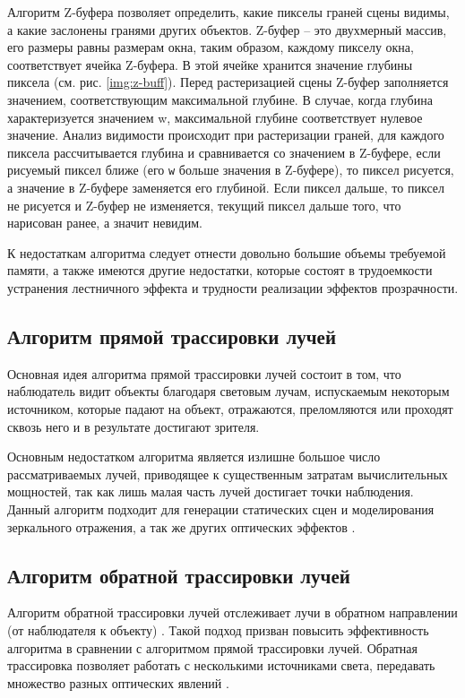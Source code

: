 Алгоритм Z-буфера \cite{rogers,shykin} позволяет определить, какие пикселы граней сцены видимы, а какие заслонены гранями других объектов. Z-буфер -- это двухмерный массив, его размеры равны размерам окна, таким образом, каждому пикселу окна, соответствует ячейка Z-буфера. В этой ячейке хранится значение глубины пиксела (см. рис. \ref{img:z-buff}). Перед растеризацией сцены Z-буфер заполняется значением, соответствующим максимальной глубине. В случае, когда глубина характеризуется значением w,
максимальной глубине соответствует нулевое значение. Анализ видимости происходит при растеризации граней, для каждого пиксела рассчитывается глубина и сравнивается со значением в Z-буфере, если рисуемый пиксел ближе (его \texttt{w} больше значения в Z-буфере), то пиксел рисуется, а значение
в Z-буфере заменяется его глубиной. Если пиксел дальше, то пиксел не рисуется и Z-буфер не изменяется, текущий пиксел дальше того, что нарисован ранее, а значит невидим. 


К недостаткам алгоритма следует отнести довольно большие объемы требуемой памяти, а также имеются другие недостатки, которые состоят в трудоемкости устранения лестничного эффекта и трудности реализации эффектов прозрачности.

\subsection{Алгоритм прямой трассировки лучей}

Основная идея алгоритма прямой трассировки лучей \cite{shykin} состоит в том, что наблюдатель видит объекты благодаря световым лучам, испускаемым некоторым источником, которые падают на объект, отражаются, преломляются или проходят сквозь него и в результате достигают зрителя.

Основным недостатком алгоритма является излишне большое число рассматриваемых лучей, приводящее к существенным затратам вычислительных мощностей, так как лишь малая часть лучей достигает точки наблюдения. Данный алгоритм подходит для генерации статических сцен и моделирования
зеркального отражения, а так же других оптических эффектов \cite{traceproblem}.

\subsection{Алгоритм обратной трассировки лучей}

Алгоритм обратной трассировки лучей отслеживает лучи в обратном направлении (от наблюдателя к объекту) \cite{shykin}. Такой подход призван повысить эффективность алгоритма в сравнении с алгоритмом прямой трассировки лучей. Обратная трассировка позволяет работать с несколькими источниками света, передавать множество разных оптических явлений \cite{snizko}.
 
